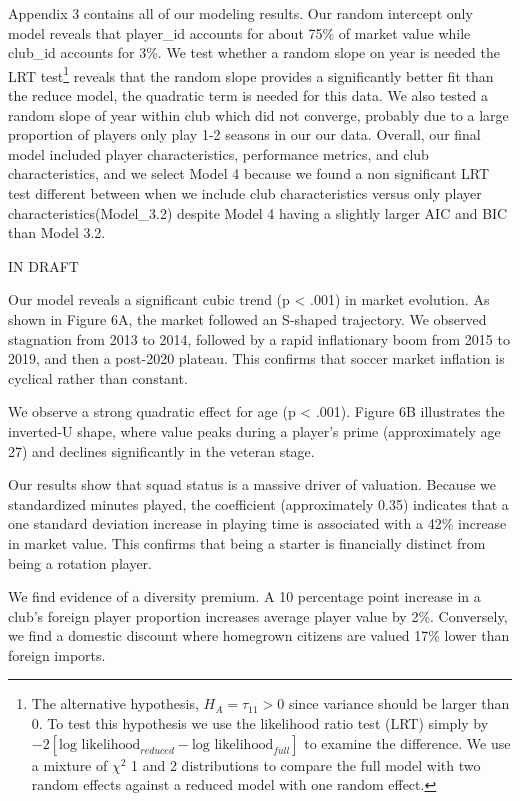 \documentclass[
  12pt]{article}
\begin{document}
Appendix 3 contains all of our modeling results. Our random intercept
only model reveals that player\_id accounts for about 75\% of market
value while club\_id accounts for 3\%. We test whether a random slope on
year is needed the LRT test\footnote{The alternative hypothesis,
  \(H_A=\tau_{11} > 0\) since variance should be larger than 0. To test
  this hypothesis we use the likelihood ratio test (LRT) simply by
  \(-2[\text{log likelihood}_{reduced} - \text{log likelihood}_{full}]\)
  to examine the difference. We use a mixture of \(\chi^2\) 1 and 2
  distributions to compare the full model with two random effects
  against a reduced model with one random effect.} reveals that the
random slope provides a significantly better fit than the reduce model,
the quadratic term is needed for this data. We also tested a random
slope of year within club which did not converge, probably due to a
large proportion of players only play 1-2 seasons in our our data.
Overall, our final model included player characteristics, performance
metrics, and club characteristics, and we select Model 4 because we
found a non significant LRT test different between when we include club
characteristics versus only player characteristics(Model\_3.2) despite
Model 4 having a slightly larger AIC and BIC than Model 3.2.

IN DRAFT

Our model reveals a significant cubic trend (p \textless{} .001) in
market evolution. As shown in Figure 6A, the market followed an S-shaped
trajectory. We observed stagnation from 2013 to 2014, followed by a
rapid inflationary boom from 2015 to 2019, and then a post-2020 plateau.
This confirms that soccer market inflation is cyclical rather than
constant.

We observe a strong quadratic effect for age (p \textless{} .001).
Figure 6B illustrates the inverted-U shape, where value peaks during a
player's prime (approximately age 27) and declines significantly in the
veteran stage.

Our results show that squad status is a massive driver of valuation.
Because we standardized minutes played, the coefficient (approximately
0.35) indicates that a one standard deviation increase in playing time
is associated with a 42\% increase in market value. This confirms that
being a starter is financially distinct from being a rotation player.

We find evidence of a diversity premium. A 10 percentage point increase
in a club's foreign player proportion increases average player value by
2\%. Conversely, we find a domestic discount where homegrown citizens
are valued 17\% lower than foreign imports.
\end{document}
